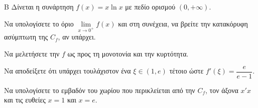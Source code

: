 \begin{thema}{Β}
Δίνεται η συνάρτηση $f(x) = x \ln x$ με πεδίο ορισμού $(0, +\infty)$.
\begin{erwthma}
\item Να υπολογίσετε το όριο $\lim\limits_{x \to 0^+} f(x)$ και στη συνέχεια, να βρείτε την κατακόρυφη ασύμπτωτη της $C_f$, αν υπάρχει.
\item Να μελετήσετε την $f$ ως προς τη μονοτονία και την κυρτότητα.
\item Να αποδείξετε ότι υπάρχει τουλάχιστον ένα $\xi \in (1, e)$ τέτοιο ώστε $f'(\xi) = \dfrac{e}{e-1}$.
\item Να υπολογίσετε το εμβαδόν του χωρίου που περικλείεται από την $C_f$, τον άξονα $x'x$ και τις ευθείες $x=1$ και $x=e$.
\end{erwthma}
\end{thema}
